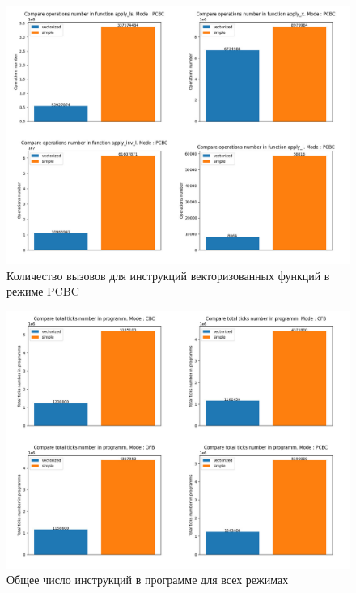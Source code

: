 \documentclass[a4paper, 12pt]{article}
\begin{document}
    \begin{figure}[h!]
        \centering
        \includegraphics[scale=0.3]{images/functions_instructions_calls_PCBC.jpg}
        \caption{Количество вызовов для инструкций векторизованных функций в режиме PCBC}
        \label{fig:functions_instructions_calls_PCBC}
    \end{figure}

    \begin{figure}[h!]
        \centering
        \includegraphics[scale=0.3]{images/total_ticks.jpg}
        \caption{Общее число инструкций в программе для всех режимах}
        \label{fig:total_ticks}
    \end{figure}
\end{document}
